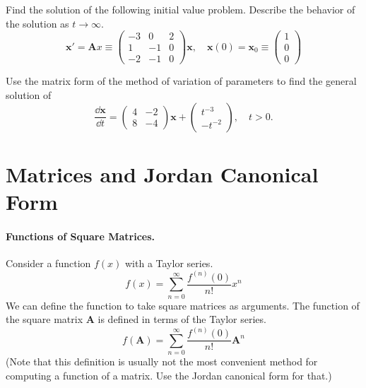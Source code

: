 \begin{Exercise}
  \label{exercise x'=(-3021-10-2-10)x t-infinity}
  Find the solution of the following initial value problem.
  Describe the behavior of the solution as $t \to \infty$.
  \[
  \mathbf{x}' = \mathbf{A} x \equiv
  \begin{pmatrix}
    -3 & 0 & 2 \\
    1 & -1 & 0 \\
    -2 & -1 & 0
  \end{pmatrix} 
  \mathbf{x}, \quad 
  \mathbf{x}(0) = \mathbf{x}_0 \equiv
  \begin{pmatrix}
    1 \\
    0 \\
    0
  \end{pmatrix}
  \]

\end{Exercise}




\begin{Exercise}
  \label{exercise dxdt=4284x+t3t2}
  Use the matrix form of the method of variation of parameters to find the 
  general solution of
  \[
  \frac{\dd \mathbf{x}}{\dd t} = 
  \begin{pmatrix}
    4 & -2 \\
    8 & -4
  \end{pmatrix}
  \mathbf{x} + 
  \begin{pmatrix}
    t^{-3} \\
    -t^{-2}
  \end{pmatrix},
  \quad t > 0.
  \]

\end{Exercise}








\section{Matrices and Jordan Canonical Form} 


\paragraph{Functions of Square Matrices.}
Consider a function $f(x)$ with a Taylor series.
\[
f(x) = \sum_{n = 0}^\infty \frac{f^{(n)}(0)}{n!} x^n
\]
We can define the function to take square matrices as arguments.
The function of the square matrix $\mathbf{A}$ is defined in terms of the 
Taylor series.
\[
f(\mathbf{A}) = \sum_{n = 0}^\infty \frac{f^{(n)}(0)}{n!} \mathbf{A}^n
\]
(Note that this definition is usually not the most convenient method
for computing a function of a matrix.  Use the Jordan canonical form for
that.)






